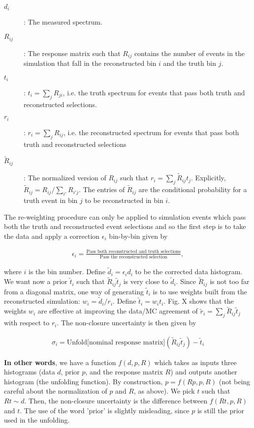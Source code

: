 \begin{description}
\item[$d_i$]: The measured spectrum. 
\item[$R_{ij}$]: The response matrix such that $R_{ij}$ contains the number of events in the simulation that fall in the reconstructed bin $i$ and the truth bin $j$.
\item[$t_i$]: $t_i = \sum_j R_{ji}$, i.e. the truth spectrum for events that pass both truth and reconstructed selections.
\item[$r_i$]: $r_i = \sum_j R_{ij}$, i.e. the reconstructed spectrum for events that pass both truth and reconstructed selections
\item[$\tilde{R}_{ij}$]: The normalized version of $R_{ij}$ such that $r_i = \sum_j \tilde{R}_{ij} t_j$.  Explicitly, $\tilde{R}_{ij} = R_{ij}/\sum_{i'} R_{i'j}$.  The entries of $\tilde{R}_{ij}$ are the conditional probability for a truth event in bin $j$ to be reconstructed in bin $i$.
\end{description}

\noindent The re-weighting procedure can only be applied to simulation events which pass both the truth and reconstructed event selections and so the first step is to take the data and apply a correction $\epsilon_i$ bin-by-bin given by 

\begin{align}
\epsilon_i = \frac{\text{Pass both reconstructed and truth selections}}{\text{Pass the reconstructed selection}},
\end{align}

\noindent where $i$ is the bin number.   Define $\tilde{d}_i = \epsilon_i d_i$ to be the corrected data histogram.  We want now a prior $\tilde{t}_i$ such that $\tilde{R}_{ij} \tilde{t}_j$ is very close to $\tilde{d}_i$.  Since $\tilde{R}_{ij}$ is not too far from a diagonal matrix, one way of generating $\tilde{t}_i$ is to use weights built from the reconstructed simulation: $w_i = \tilde{d}_i/r_i$.  Define $\tilde{t}_i=w_it_i$.  Fig. X shows that the weights $w_i$ are effective at improving the data/MC agreement of $\tilde{r}_i=\sum_j\tilde{R}_{ij}\tilde{t}_j$ with respect to $r_i$.  The non-closure uncertainty is then given by

\begin{align}
\sigma_i=\text{Unfold[nominal response matrix]}\left(\tilde{R}_{ij} \tilde{t}_j\right)-\tilde{t}_i
\end{align}

\textbf{In other words}, we have a function $f(d,p,R)$ which takes as inputs three histograms (data $d$, prior $p$, and the response matrix $R$) and outputs another histogram (the unfolding function).  By construction, $p=f(Rp,p,R)$ (not being careful about the normalization of $p$ and $R$, as above).  We pick $t$ such that $Rt\sim d$.  Then, the non-closure uncertainty is the difference between $f(Rt,p,R)$ and $t$.  The use of the word 'prior' is slightly misleading, since $p$ is still the prior used in the unfolding.

